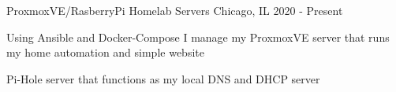

\begin{cventries}

  \cventry
    {ProxmoxVE/RasberryPi} %
    {Homelab Servers} %
    {Chicago, IL} %
    {2020 - Present} %
    {
      \begin{cvitems} %
      \item {Using Ansible and Docker-Compose I manage my ProxmoxVE server that runs my home automation and simple website}
      \item {Pi-Hole server that functions as my local DNS and DHCP server}
      \end{cvitems}
    }

\end{cventries}

